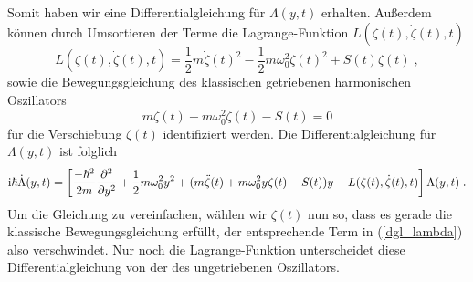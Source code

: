 
      Somit haben wir eine Differentialgleichung für $\Lambda(y,t)$ erhalten.
      Außerdem können durch Umsortieren der Terme die Lagrange-Funktion $L(\zeta(t),\dot \zeta(t), t)$
      \begin{equation}
        L(\zeta(t),\dot \zeta(t), t) = \frac{1}{2}m\dot \zeta(t)^2 - \frac{1}{2}m\omega_0^2\zeta(t)^2 + S(t)\zeta(t) \; ,
        \label{lagrange_zeta}
      \end{equation}
        sowie die Bewegungsgleichung des klassischen getriebenen harmonischen  Oszillators~\cite{husimi}
        \begin{equation}
          m\ddot \zeta(t) + m\omega_0^2\zeta(t) - S(t) = 0
          \label{dgl_zeta}
        \end{equation}
      für die Verschiebung $\zeta(t)$ identifiziert werden.
      Die Differentialgleichung für $\Lambda(y,t)$ ist folglich
      \begin{equation}
        \text i \hbar \dot \Lambda(y,t) = \left[ \frac{-\hbar^2}{2m}\frac{\partial^2}{\partial y^2} + \frac{1}{2}m\omega_0^2y^2 + (m\ddot \zeta(t) + m\omega_0^2y\zeta(t) - S(t))y - L(\zeta(t),\dot \zeta(t), t) \right]\Lambda(y,t) \; .
        \label{dgl_lambda}
      \end{equation}
      Um die Gleichung zu vereinfachen, wählen wir $\zeta(t)$ nun so, dass es gerade die klassische Bewegungsgleichung erfüllt, der entsprechende Term in (\ref{dgl_lambda}) also verschwindet.
      Nur noch die Lagrange-Funktion unterscheidet diese Differentialgleichung von der des ungetriebenen Oszillators.

